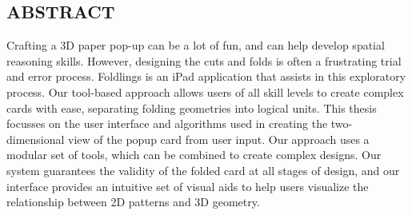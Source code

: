 \pagestyle{plain}
\begin{center}


\section*{ABSTRACT}


\end{center}
Crafting a 3D paper pop-up can be a lot of fun, and can help develop spatial reasoning skills.  However, designing the cuts and folds is often a frustrating trial and error process.  Foldlings is an iPad application that assists in this exploratory process.   Our tool-based approach allows users of all skill levels to create complex cards with ease, separating folding geometries into logical units.  This thesis focusses on the user interface and algorithms used in creating the two-dimensional view of the popup card from user input.
Our approach uses a modular set of tools, which can be combined to create complex designs.  Our system guarantees the validity of the folded card at all stages of design, and our interface provides an intuitive set of visual aids to help users visualize the relationship between 2D patterns and 3D geometry.

\cleardoublepage
